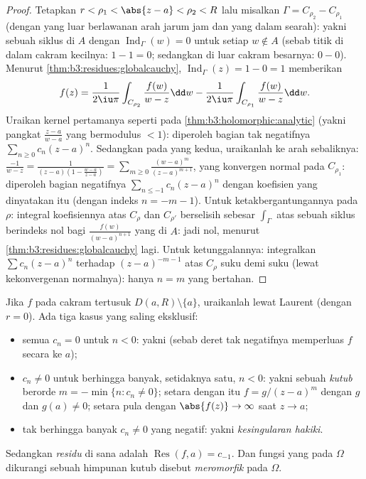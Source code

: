 \begin{proof}
Tetapkan $r < \rho_1 < \abs{z - a} < \rho_2 < R$ lalu misalkan $\Gamma =
C_{\rho_2} - C_{\rho_1}$ (dengan yang luar berlawanan arah jarum jam dan yang dalam
searah): yakni sebuah siklus di $A$ dengan
$\operatorname{Ind}_\Gamma(w) = 0$ untuk setiap $w \notin A$
(sebab titik di dalam cakram kecilnya: $1 - 1 = 0$; sedangkan di luar cakram
besarnya: $0 - 0$). Menurut \cref{thm:b3:residues:globalcauchy},
$\operatorname{Ind}_\Gamma(z) = 1 - 0 = 1$ memberikan
\[
f(z) = \frac1{2\iu\pi}\int_{C_{\rho_2}}\frac{f(w)}{w - z}\dd
w - \frac1{2\iu\pi}\int_{C_{\rho_1}}\frac{f(w)}{w - z}\dd w .
\]
Uraikan kernel pertamanya seperti pada
\cref{thm:b3:holomorphic:analytic} (yakni pangkat $\frac{z -
a}{w - a}$ yang bermodulus $< 1$): diperoleh bagian tak negatifnya
$\sum_{n\geq0}c_n(z-a)^n$. Sedangkan pada yang kedua, uraikanlah ke arah
sebaliknya: $\frac{-1}{w - z} = \frac1{(z-a)(1 - \frac{w - a}{z -
a})} = \sum_{m\geq0}\frac{(w-a)^m}{(z - a)^{m+1}}$, yang konvergen
normal pada $C_{\rho_1}$: diperoleh bagian negatifnya
$\sum_{n\leq-1}c_n(z-a)^n$ dengan koefisien yang dinyatakan itu (dengan indeks
$n = -m-1$). Untuk ketakbergantungannya pada $\rho$: integral koefisiennya
atas $C_{\rho}$ dan $C_{\rho'}$ berselisih sebesar
$\int_\Gamma$ atas sebuah siklus berindeks nol bagi
$\frac{f(w)}{(w-a)^{n+1}}$ yang  di $A$: jadi nol, menurut
\cref{thm:b3:residues:globalcauchy} lagi. Untuk ketunggalannya:
integralkan $\sum c_n(z-a)^n$ terhadap $(z - a)^{-m-1}$ atas
$C_\rho$ suku demi suku (lewat kekonvergenan normalnya): hanya $n = m$
yang bertahan.
\end{proof}

\begin{definition}\label{def:b3:residues:singularities}
Jika $f$  pada cakram tertusuk $D(a, R)\setminus
\{a\}$, uraikanlah lewat Laurent (dengan $r = 0$). Ada tiga
kasus yang saling eksklusif:
\begin{itemize}
  \item semua $c_n = 0$ untuk $n < 0$: yakni \emph{} (sebab deret tak negatifnya memperluas $f$
        secara  ke $a$);
  \item $c_n \neq 0$ untuk berhingga banyak, setidaknya satu, $n < 0$:
        yakni sebuah \emph{kutub} berorde $m = -\min\{n : c_n \neq 0\}$;
        setara dengan itu $f = g/(z-a)^m$ dengan $g$  dan $g(a)
        \neq 0$; setara pula dengan $\abs{f(z)} \to \infty$ saat $z\to
        a$;
  \item tak berhingga banyak $c_n \neq 0$ yang negatif: yakni
        \emph{kesingularan hakiki}.
\end{itemize}
Sedangkan \emph{residu} di sana adalah
$\operatorname{Res}(f, a) = c_{-1}$. Dan fungsi yang  pada
$\Omega$ dikurangi sebuah himpunan kutub disebut
\emph{meromorfik} pada $\Omega$.
\end{definition}

